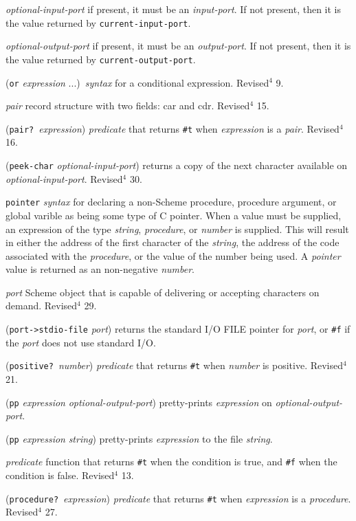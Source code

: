 \documentclass[10pt,twocolumn]{article}
\begin{document}
\emph{optional-input-port} if present, it must be an \emph{input-port}.  If
not present, then it is the value returned by \texttt{current-input-port}.

\emph{optional-output-port} if present, it must be an \emph{output-port}.  If
not present, then it is the value returned by \texttt{current-output-port}.

(\texttt{or} \emph{expression} ...)\ \emph{syntax} for a conditional expression.
Revised$^4$ 9.

\emph{pair} record structure with two fields: car and cdr.  Revised$^4$
15.

(\texttt{pair?}\ \emph{expression}) \emph{predicate} that returns \texttt{\#t} when
\emph{expression} is a \emph{pair}.  Revised$^4$ 16.

(\texttt{peek-char} \emph{optional-input-port}) returns a copy of the next
character available on  \emph{optional-input-port}.  Revised$^4$ 30.

\texttt{pointer} \emph{syntax} for declaring a non-Scheme procedure,
procedure argument, or global varible as being some type of C
pointer.  When a value must be supplied, an expression of the type
\emph{string}, \emph{procedure}, or \emph{number} is supplied.  This will
result in either the address of the first character of the
\emph{string}, the address of the code associated with the
\emph{procedure}, or the value of the number being used.  A \emph{pointer}
value is returned as an non-negative \emph{number}.

\emph{port} Scheme object that is capable of delivering or accepting
characters on demand.  Revised$^4$ 29.

(\texttt{port->stdio-file} \emph{port}) returns the standard I/O FILE
pointer for \emph{port}, or \texttt{\#f} if the \emph{port} does not use
standard I/O.

(\texttt{positive?}\ \emph{number}) \emph{predicate} that returns \texttt{\#t} when
\emph{number} is positive.  Revised$^4$ 21.

(\texttt{pp} \emph{expression} \emph{optional-output-port}) pretty-prints
\emph{expression} on \emph{optional-output-port}.

(\texttt{pp} \emph{expression} \emph{string}) pretty-prints \emph{expression} to
the file \emph{string}.

\emph{predicate} function that returns \texttt{\#t} when the condition
is true, and \texttt{\#f} when the condition is false.  Revised$^4$ 13.

(\texttt{procedure?}\ \emph{expression}) \emph{predicate} that returns \texttt{\#t}
when \emph{expression} is a \emph{procedure}.  Revised$^4$ 27.
\end{document}
